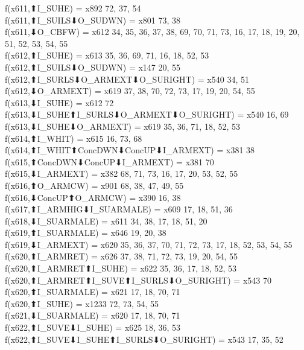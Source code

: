 f(x611,⬆I_SUHE) = x892 {72, 37, 54} \\
f(x611,⬆I_SUILS⬇O_SUDWN) = x801 {73, 38} \\
f(x611,⬇O_CBFW) = x612 {34, 35, 36, 37, 38, 69, 70, 71, 73, 16, 17, 18, 19, 20, 51, 52, 53, 54, 55} \\
f(x612,⬆I_SUHE) = x613 {35, 36, 69, 71, 16, 18, 52, 53} \\
f(x612,⬆I_SUILS⬇O_SUDWN) = x147 {20, 55} \\
f(x612,⬆I_SURLS⬇O_ARMEXT⬇O_SURIGHT) = x540 {34, 51} \\
f(x612,⬇O_ARMEXT) = x619 {37, 38, 70, 72, 73, 17, 19, 20, 54, 55} \\
f(x613,⬇I_SUHE) = x612 {72} \\
f(x613,⬇I_SUHE⬆I_SURLS⬇O_ARMEXT⬇O_SURIGHT) = x540 {16, 69} \\
f(x613,⬇I_SUHE⬇O_ARMEXT) = x619 {35, 36, 71, 18, 52, 53} \\
f(x614,⬆I_WHIT) = x615 {16, 73, 68} \\
f(x614,⬆I_WHIT⬆ConcDWN⬇ConcUP⬇I_ARMEXT) = x381 {38} \\
f(x615,⬆ConcDWN⬇ConcUP⬇I_ARMEXT) = x381 {70} \\
f(x615,⬇I_ARMEXT) = x382 {68, 71, 73, 16, 17, 20, 53, 52, 55} \\
f(x616,⬆O_ARMCW) = x901 {68, 38, 47, 49, 55} \\
f(x616,⬇ConcUP⬆O_ARMCW) = x390 {16, 38} \\
f(x617,⬆I_ARMHIG⬇I_SUARMALE) = x609 {17, 18, 51, 36} \\
f(x618,⬇I_SUARMALE) = x611 {34, 38, 17, 18, 51, 20} \\
f(x619,⬆I_SUARMALE) = x646 {19, 20, 38} \\
f(x619,⬇I_ARMEXT) = x620 {35, 36, 37, 70, 71, 72, 73, 17, 18, 52, 53, 54, 55} \\
f(x620,⬆I_ARMRET) = x626 {37, 38, 71, 72, 73, 19, 20, 54, 55} \\
f(x620,⬆I_ARMRET⬆I_SUHE) = x622 {35, 36, 17, 18, 52, 53} \\
f(x620,⬆I_ARMRET⬆I_SUVE⬆I_SURLS⬇O_SURIGHT) = x543 {70} \\
f(x620,⬆I_SUARMALE) = x621 {17, 18, 70, 71} \\
f(x620,⬆I_SUHE) = x1233 {72, 73, 54, 55} \\
f(x621,⬇I_SUARMALE) = x620 {17, 18, 70, 71} \\
f(x622,⬆I_SUVE⬇I_SUHE) = x625 {18, 36, 53} \\
f(x622,⬆I_SUVE⬇I_SUHE⬆I_SURLS⬇O_SURIGHT) = x543 {17, 35, 52} \\
